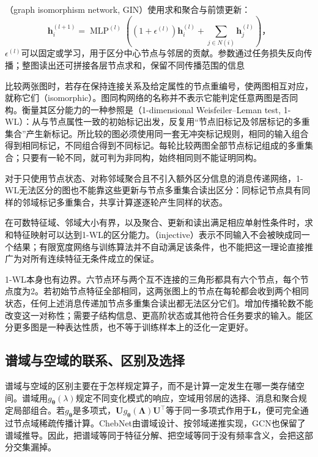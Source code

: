 （graph isomorphism network, GIN）使用求和聚合与前馈更新：
\begin{equation}
  \bm{h}_i^{(l+1)}=\operatorname{MLP}^{(l)}\!\left(
    (1+\epsilon^{(l)})\bm{h}_i^{(l)}
      +\sum_{j\in N(i)}\bm{h}_j^{(l)}\right)\text{，}
  \label{eq:gnn-gin}
\end{equation}
$\epsilon^{(l)}$可以固定或学习，用于区分中心节点与邻居的贡献。参数通过任务损失反向传播；整图读出还可拼接各层节点求和，保留不同传播范围的信息

比较两张图时，若存在保持连接关系及给定属性的节点重编号，使两图相互对应，就称它们（isomorphic）。图同构网络的名称并不表示它能判定任意两图是否同构。衡量其区分能力的一种参照是（1-dimensional Weisfeiler--Leman test, 1-WL）：从与节点属性一致的初始标记出发，反复用“节点旧标记及邻居标记的多重集合”产生新标记。所比较的图必须使用同一套无冲突标记规则，相同的输入组合得到相同标记，不同组合得到不同标记。每轮比较两图全部节点标记组成的多重集合；只要有一轮不同，就可判为非同构，始终相同则不能证明同构。

对于只使用节点状态、对称邻域聚合且不引入额外区分信息的消息传递网络，1-WL无法区分的图也不能靠这些更新与节点多重集合读出区分：同标记节点具有同样的邻域标记多重集合，共享计算遂逐轮产生同样的状态。

在可数特征域、邻域大小有界，以及聚合、更新和读出满足相应单射性条件时，求和特征映射可以达到1-WL的区分能力。（injective）表示不同输入不会被映成同一个结果；有限宽度网络与训练算法并不自动满足该条件，也不能把这一理论直接推广为对所有连续特征无条件成立的保证。

1-WL本身也有边界。六节点环与两个互不连接的三角形都具有六个节点，每个节点度为2。若初始节点特征全部相同，这两张图上的节点在每轮都会收到两个相同状态，任何上述消息传递加节点多重集合读出都无法区分它们。增加传播轮数不能改变这一对称性；需要子结构信息、更高阶状态或其他符合任务要求的输入。能区分更多图是一种表达性质，也不等于训练样本上的泛化一定更好。

\subsection{谱域与空域的联系、区别及选择}
\label{sec:gnn-spectral-spatial-comparison}

谱域与空域的区别主要在于怎样规定算子，而不是计算一定发生在哪一类存储空间。谱域用$g_{\bm{\theta}}(\lambda)$规定不同变化模式的响应，空域用邻居的选择、消息和聚合规定局部组合。若$g_{\bm{\theta}}$是多项式，$\bm{U}g_{\bm{\theta}}(\bm{\Lambda})\bm{U}^{\top}$等于同一多项式作用于$\bm{L}$，便可完全通过节点域稀疏传播计算。ChebNet由谱域设计、按邻域递推实现，GCN也保留了谱域推导。因此，把谱域等同于特征分解、把空域等同于没有频率含义，会把这部分交集漏掉。

